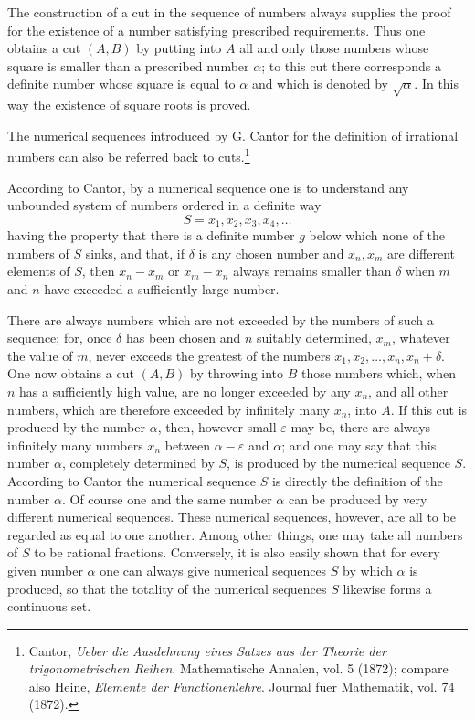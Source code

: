 \documentclass[11pt]{article}
\begin{document}
The construction of a cut in the sequence of numbers always supplies the proof for the existence of a number satisfying prescribed requirements. Thus one obtains a cut $(A,B)$ by putting into $A$ all and only those numbers whose square is smaller than a prescribed number $\alpha$; to this cut there corresponds a definite number whose square is equal to $\alpha$ and which is denoted by $\sqrt\alpha$. In this way the existence of square roots is proved.

The numerical sequences introduced by G. Cantor for the definition of irrational numbers can also be referred back to cuts.\footnote{Cantor, \emph{Ueber die Ausdehnung eines Satzes aus der Theorie der trigonometrischen Reihen}. Mathematische Annalen, vol. 5 (1872); compare also Heine, \emph{Elemente der Functionenlehre}. Journal fuer Mathematik, vol. 74 (1872).}

According to Cantor, by a numerical sequence one is to understand any unbounded system of numbers ordered in a definite way
\[
 S=x_1,x_2,x_3,x_4,\ldots
\]
having the property that there is a definite number $g$ below which none of the numbers of $S$ sinks, and that, if $\delta$ is any chosen number and $x_n,x_m$ are different elements of $S$, then $x_n-x_m$ or $x_m-x_n$ always remains smaller than $\delta$ when $m$ and $n$ have exceeded a sufficiently large number.

There are always numbers which are not exceeded by the numbers of such a sequence; for, once $\delta$ has been chosen and $n$ suitably determined, $x_m$, whatever the value of $m$, never exceeds the greatest of the numbers $x_1,x_2,\ldots,x_n,x_n+\delta$. One now obtains a cut $(A,B)$ by throwing into $B$ those numbers which, when $n$ has a sufficiently high value, are no longer exceeded by any $x_n$, and all other numbers, which are therefore exceeded by infinitely many $x_n$, into $A$. If this cut is produced by the number $\alpha$, then, however small $\varepsilon$ may be, there are always infinitely many numbers $x_n$ between $\alpha-\varepsilon$ and $\alpha$; and one may say that this number $\alpha$, completely determined by $S$, is produced by the numerical sequence $S$. According to Cantor the numerical sequence $S$ is directly the definition of the number $\alpha$. Of course one and the same number $\alpha$ can be produced by very different numerical sequences. These numerical sequences, however, are all to be regarded as equal to one another. Among other things, one may take all numbers of $S$ to be rational fractions. Conversely, it is also easily shown that for every given number $\alpha$ one can always give numerical sequences $S$ by which $\alpha$ is produced, so that the totality of the numerical sequences $S$ likewise forms a continuous set.
\end{document}
